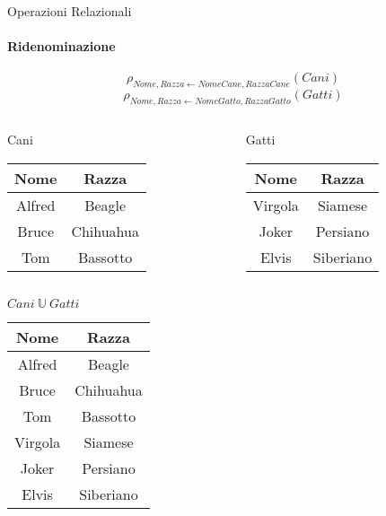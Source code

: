    \begin{frame}{Operazioni Relazionali}
        \framesubtitle{Ridenominazione}
        \vspace{-1.2cm}
        \[\rho_{Nome,Razza \leftarrow NomeCane, RazzaCane} (Cani)\]
        \[\rho_{Nome,Razza \leftarrow NomeGatto, RazzaGatto} (Gatti)\]
        \vspace{-.4cm}
        \begin{columns}
            \begin{column}{0.48\textwidth}
                \centering
                {\small Cani}
                \newline
        \begin{tabular}{|c|c|}
            \hline
            \cellcolor{red!30}Nome & \cellcolor{green!30}Razza \\
            \hline
            Alfred & Beagle \\ \hline
            Bruce & Chihuahua \\ \hline
            Tom & Bassotto \\ \hline
            \end{tabular}
            \end{column}
            \begin{column}{0.48\textwidth}
                \centering
                {\small Gatti}
                \newline
                \begin{tabular}{|c|c|}
                    \hline
                    \cellcolor{red!30}Nome & \cellcolor{green!30}Razza \\ \hline
                    Virgola & Siamese \\ \hline
            Joker & Persiano \\ \hline
            Elvis & Siberiano \\ \hline
                    \end{tabular}
            \end{column}
        \end{columns}
        \centering
        $Cani~\mathbb{U}~Gatti$\\
        \begin{tabular}{|c|c|}
            \hline
            \rowcolor{cyan!30}Nome & Razza \\
            \hline
            Alfred & Beagle \\ \hline
            Bruce & Chihuahua \\ \hline
            Tom & Bassotto \\ \hline
            Virgola & Siamese \\ \hline
            Joker & Persiano \\ \hline
            Elvis & Siberiano \\ \hline
        \end{tabular}
    \end{frame}
